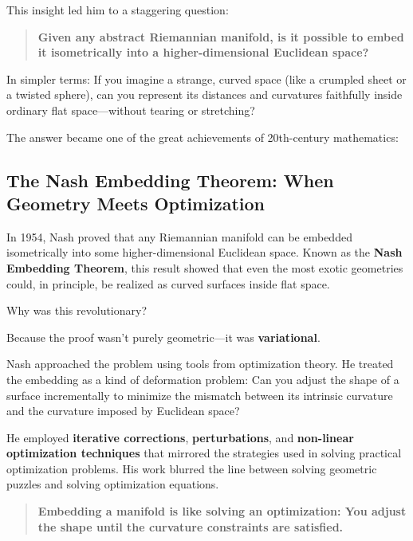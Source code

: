 This insight led him to a staggering question:

\begin{quote}
\textbf{Given any abstract Riemannian manifold, is it possible to embed it isometrically into a higher-dimensional Euclidean space?}
\end{quote}

In simpler terms:  
If you imagine a strange, curved space (like a crumpled sheet or a twisted sphere), can you represent its distances and curvatures faithfully inside ordinary flat space—without tearing or stretching?

The answer became one of the great achievements of 20th-century mathematics:

\subsection{The Nash Embedding Theorem: When Geometry Meets Optimization}

In 1954, Nash proved that any Riemannian manifold can be embedded isometrically into some higher-dimensional Euclidean space. Known as the \textbf{Nash Embedding Theorem}, this result showed that even the most exotic geometries could, in principle, be realized as curved surfaces inside flat space.

Why was this revolutionary?

Because the proof wasn’t purely geometric—it was \textbf{variational}.

Nash approached the problem using tools from optimization theory. He treated the embedding as a kind of deformation problem:  
Can you adjust the shape of a surface incrementally to minimize the mismatch between its intrinsic curvature and the curvature imposed by Euclidean space?

He employed \textbf{iterative corrections}, \textbf{perturbations}, and \textbf{non-linear optimization techniques} that mirrored the strategies used in solving practical optimization problems. His work blurred the line between solving geometric puzzles and solving optimization equations.

\begin{tcolorbox}[colback=blue!5!white, colframe=blue!50!black, title={Nash’s Theorem: Geometry as an Optimization Problem}]
\begin{quote}
\textbf{Embedding a manifold is like solving an optimization:  
You adjust the shape until the curvature constraints are satisfied.}
\end{quote}
\end{tcolorbox}

